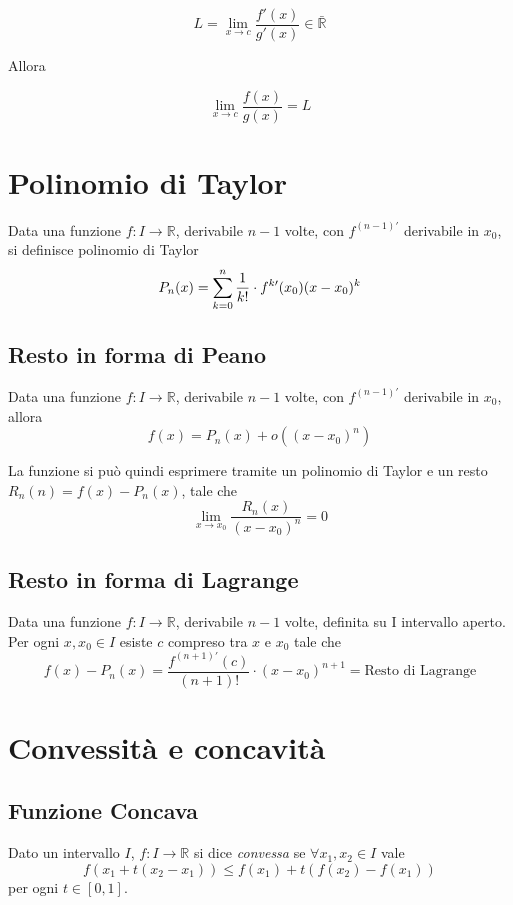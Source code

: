 $$ L = \lim_{x \to c}{\frac{f'(x)}{g'(x)}} \in \mathbb{\bar{R}} $$

Allora

$$\lim_{x \to c}{\frac{f(x)}{g(x)}} = L$$

\section{Polinomio di Taylor}

Data una funzione $f: I\to \mathbb{R}$, derivabile $n-1$ volte, con $f^{(n-1)\prime}$ derivabile in $x_0$, si definisce polinomio di Taylor $$P_n(x)=\sum\limits_{k=0}^{n}\frac{1}{k!}\cdot f^{k\prime}(x_0)(x-x_0)^k$$


\subsection{Resto in forma di Peano}

Data una funzione $f: I\to \mathbb{R}$, derivabile $n-1$ volte, con $f^{(n-1)\prime}$ derivabile in $x_0$, allora $$f(x)=P_n(x)+o((x-x_0)^n)$$

La funzione si può quindi esprimere tramite un polinomio di Taylor e un resto $R_n(n)=f(x)-P_n(x)$, tale che $$\lim_{x\to x_0} \frac{R_n(x)}{(x-x_0)^n}=0$$

\subsection{Resto in forma di Lagrange}

Data una funzione $f: I\to \mathbb{R}$, derivabile $n-1$ volte, definita su I intervallo aperto. Per ogni $x,x_0 \in I$ esiste $c$ compreso tra $x$ e $x_0$ tale che $$f(x)-P_n(x)=\frac{f^{(n+1)\prime}(c)}{(n+1)!}\cdot (x-x_0)^{n+1} = \text{Resto di Lagrange}$$ 

\section{Convessità e concavità}

\subsection{Funzione Concava}
Dato un intervallo $I$, $f: I \to \mathbb{R}$ si dice \emph{convessa} se $\forall x_1, x_2 \in I$ vale
\begin{equation*}
f(x_1 + t(x_2-x_1)) \le f(x_1) + t(f(x_2)-f(x_1))
\end{equation*}
per ogni $t \in [0,1]$.

